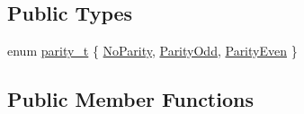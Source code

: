 \subsection*{Public Types}
\begin{DoxyCompactItemize}
\item 
enum \hyperlink{classmdt_serial_port_config_a4b9e444637cf0193a125fabdd67d8bfe}{parity\-\_\-t} \{ \hyperlink{classmdt_serial_port_config_a4b9e444637cf0193a125fabdd67d8bfea26782a0702ecb454d8ffcd19926ebf15}{No\-Parity}, 
\hyperlink{classmdt_serial_port_config_a4b9e444637cf0193a125fabdd67d8bfea04c4b0061d3060fc47f796c4b19a52a8}{Parity\-Odd}, 
\hyperlink{classmdt_serial_port_config_a4b9e444637cf0193a125fabdd67d8bfeae72abbbf89ac3bc4837de395f876e025}{Parity\-Even}
 \}
\end{DoxyCompactItemize}
\subsection*{Public Member Functions}
